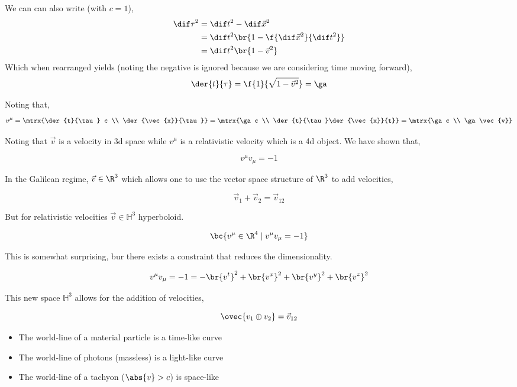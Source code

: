 \documentclass{article}
\begin{document}
We can can also write (with $c=1$),
\begin{align*}
\dif \tau^2 &= \dif t^2 - \dif \vec{x}^2 \\
&= \dif t^2\br{1 - \f{\dif \vec{x}^2}{\dif t^2}} \\
&= \dif t^2\br{1 - \vec{v}^2} \\
\end{align*}
Which when rearranged yields (noting the negative is ignored because we are considering time moving forward),
\[ \der{t}{\tau} = \f{1}{\sqrt{1-\vec{v}^2}} = \ga \]

Noting that,
\[ v^\mu = \mtrx{\der{t}{\tau} c \\ \der{\vec{x}}{\tau}} = \mtrx{\ga c \\ \der{t}{\tau}\der{\vec{x}}{t}} = \mtrx{\ga c \\ \ga\vec{v}} \]

Noting that $\vec{v}$ is a velocity in 3d space while $v^\mu$ is a relativistic velocity which is a 4d object. We have shown that,

\[ v^\mu v_\mu = -1 \]

In the Galilean regime, $\vec{v} \in \R^3$ which allows one to use the vector space structure of $\R^3$ to add velocities,

\[ \vec{v}_1 + \vec{v}_2 = \vec{v}_{12}\]

But for relativistic velocities $\vec{v} \in \mathbb{H}^3$ hyperboloid.

\[ \bc{v^\mu \in \R^4 \mid v^\mu v_\mu = -1} \]

This is somewhat surprising, bur there exists a constraint that reduces the dimensionality.

\[ v^\mu v_\mu = -1 = - \br{v^t}^2 + \br{v^x}^2 + \br{v^y}^2 + \br{v^z}^2 \]

\begin{center}
\end{center}

This new space $\mathbb{H}^3$ allows for the addition of velocities,

\[ \ovec{v_1 \oplus v_2} = \vec{v}_{12} \]


\begin{itemize}
    \item The world-line of a material particle is a time-like curve
    \item The world-line of photons (massless) is a light-like curve
    \item The world-line of a tachyon ($\abs{v} > c$) is space-like
\end{itemize}
\end{document}
